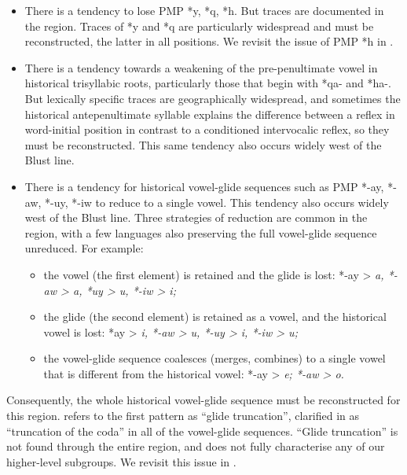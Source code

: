 \begin{itemize}
	\item There is a tendency to lose PMP *y, *q, *h.
				But traces are documented in the region.
				Traces of *y and *q are particularly widespread
				and must be reconstructed,
				the latter in all positions.
				We revisit the issue of PMP *h in .
	\item There is a tendency towards a weakening of the
				pre-penultimate vowel in historical trisyllabic roots,
				particularly those that begin with *qa- and *ha-.
				But lexically specific traces are geographically widespread,
				and sometimes the historical antepenultimate syllable explains
				the difference between a reflex in word-initial position
				in contrast to a conditioned intervocalic reflex,
				so they must be reconstructed.
				This same tendency also occurs widely west of the Blust line.
	\item There is a tendency for historical vowel-glide sequences
				such as PMP \mbox{*-ay}, *-aw, *-uy, *-iw to reduce to a single vowel.
				This tendency also occurs widely west of the Blust line.
				Three strategies of reduction are common in the region,
				with a few languages also preserving the full vowel-glide sequence unreduced.
				For example: 
	\begin{itemize}
		\item the vowel (the first element) is retained
					and the glide is lost:
					*-ay > \it{a}, *-aw > \it{a},
					*uy > \it{u}, *-iw > \it{i}; 
		\item the glide (the second element)
					is retained as a vowel,
					and the historical vowel is lost:
					*{\nbhyp}ay > \it{i}, *-aw > \it{u}, *-uy > \it{i}, *-iw > \it{u}; 
		\item the vowel-glide sequence coalesces (merges,
					combines) to a single vowel that is different from
					the historical vowel: *-ay > \it{e}; *-aw > \it{o}.
	\end{itemize}
\end{itemize}

Consequently,
the whole historical vowel-glide sequence must be reconstructed for this region.
\citet{Blust1993} refers to the first pattern as “glide truncation”,
clarified in \citet[31]{Blust2009} as “truncation of the coda”
in all of the vowel-glide sequences.
“Glide truncation” is not found through the entire region,
and does not fully characterise any of our higher-level subgroups.
We revisit this issue in .

